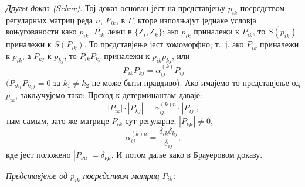 \documentclass[11pt]{article}
\begin{document}
\emph{Другы доказ (Schur).} Тој доказ основан јест на прєдставјењу \(p_{ik}\) посрєдством регуларных матриц реда \(n\), \(P_{ik}\), в \(\Gamma\), кторе изполњајут једнаке условја коњугованости како \(p_{ik}\). \(P_{ik}\) лежи в \(\{\mathsf{Z}_i,\mathsf{Z}_k\}\); ако \(p_{ik}\) приналежи к \(P_{ik}\), то \(S(p_{ik})\) приналежи к \(S(P_{ik})\). То прєдставјење јест хомоморфно; т.~ј. ако \(P_{ik}\) приналежи к \(p_{ik}\), а \(P_{kj}\) к \(p_{kj}\), то \(P_{ik}P_{kj}\) приналежи к \(p_{ik}p_{kj}\), или
\[
P_{ik}P_{kj}=\alpha_{ij}^{(k)}P_{ij}
\]
\((P_{ik_1}P_{k_2j}=0\) за \(k_1\neq k_2\) не може быти правдиво). Ако имајемо то прєдставјење од \(p_{ik}\), закључујемо тако: Прєход к детерминантам даваје:
\[
|P_{ik}|\cdot |P_{kj}|=\alpha_{ij}^{(k)n}\cdot |P_{ij}|,
\]
тым самым, зато же матрице \(P_{ik}\) сут регуларне, \(|P_{\nu\mu}|\ne0\),
\[
\alpha_{ij}^{(k)n}=\frac{\delta_{ik}\delta_{kj}}{\delta_{ij}},
\]
кде јест положено \(|P_{\nu\mu}|=\delta_{\nu\mu}\). И потом даље како в Брауеровом доказу.

\emph{Прєдставјење од \(p_{ik}\) посрєдством матриц \(P_{ik}\):}
\end{document}
